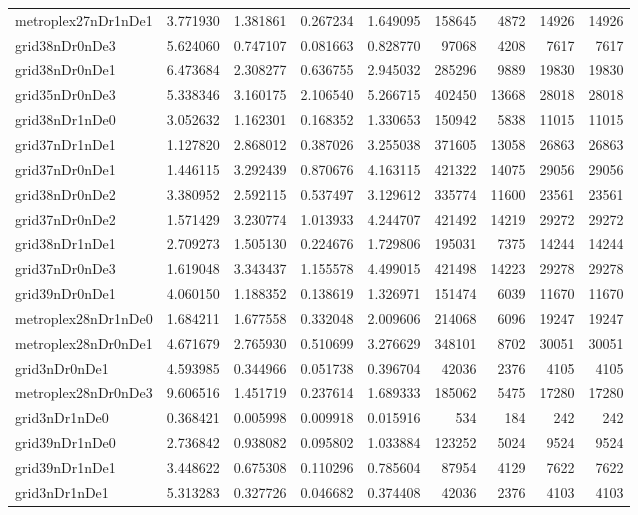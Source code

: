 \begin{longtable}{|l|r|r|r|r|r|r|r|r|}
metroplex27nDr1nDe1 & 3.771930 & 1.381861 & 0.267234 & 1.649095 & 158645 & 4872 & 14926 & 14926 \\
grid38nDr0nDe3 & 5.624060 & 0.747107 & 0.081663 & 0.828770 & 97068 & 4208 & 7617 & 7617 \\
grid38nDr0nDe1 & 6.473684 & 2.308277 & 0.636755 & 2.945032 & 285296 & 9889 & 19830 & 19830 \\
grid35nDr0nDe3 & 5.338346 & 3.160175 & 2.106540 & 5.266715 & 402450 & 13668 & 28018 & 28018 \\
grid38nDr1nDe0 & 3.052632 & 1.162301 & 0.168352 & 1.330653 & 150942 & 5838 & 11015 & 11015 \\
grid37nDr1nDe1 & 1.127820 & 2.868012 & 0.387026 & 3.255038 & 371605 & 13058 & 26863 & 26863 \\
grid37nDr0nDe1 & 1.446115 & 3.292439 & 0.870676 & 4.163115 & 421322 & 14075 & 29056 & 29056 \\
grid38nDr0nDe2 & 3.380952 & 2.592115 & 0.537497 & 3.129612 & 335774 & 11600 & 23561 & 23561 \\
grid37nDr0nDe2 & 1.571429 & 3.230774 & 1.013933 & 4.244707 & 421492 & 14219 & 29272 & 29272 \\
grid38nDr1nDe1 & 2.709273 & 1.505130 & 0.224676 & 1.729806 & 195031 & 7375 & 14244 & 14244 \\
grid37nDr0nDe3 & 1.619048 & 3.343437 & 1.155578 & 4.499015 & 421498 & 14223 & 29278 & 29278 \\
grid39nDr0nDe1 & 4.060150 & 1.188352 & 0.138619 & 1.326971 & 151474 & 6039 & 11670 & 11670 \\
metroplex28nDr1nDe0 & 1.684211 & 1.677558 & 0.332048 & 2.009606 & 214068 & 6096 & 19247 & 19247 \\
metroplex28nDr0nDe1 & 4.671679 & 2.765930 & 0.510699 & 3.276629 & 348101 & 8702 & 30051 & 30051 \\
grid3nDr0nDe1 & 4.593985 & 0.344966 & 0.051738 & 0.396704 & 42036 & 2376 & 4105 & 4105 \\
metroplex28nDr0nDe3 & 9.606516 & 1.451719 & 0.237614 & 1.689333 & 185062 & 5475 & 17280 & 17280 \\
grid3nDr1nDe0 & 0.368421 & 0.005998 & 0.009918 & 0.015916 & 534 & 184 & 242 & 242 \\
grid39nDr1nDe0 & 2.736842 & 0.938082 & 0.095802 & 1.033884 & 123252 & 5024 & 9524 & 9524 \\
grid39nDr1nDe1 & 3.448622 & 0.675308 & 0.110296 & 0.785604 & 87954 & 4129 & 7622 & 7622 \\
grid3nDr1nDe1 & 5.313283 & 0.327726 & 0.046682 & 0.374408 & 42036 & 2376 & 4103 & 4103 \\

\end{longtable}
